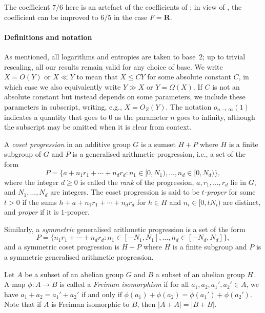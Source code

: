 \documentclass[twoside, 10pt]{article}
\newcommand{\RR}{\mathbf{R}}   %
\begin{document}
The coefficient $7/6$ here is an artefact of the coefficients 
of ; in view of , the 
coefficient can be improved to $6/5$ in the case $F=\RR$.

\paragraph{Definitions and notation}
As mentioned, all logarithms and entropies are taken to base~2; 
up to trivial rescaling, all our results remain valid for any choice 
of base. We write $X = O(Y)$ or $X\ll Y$ to mean that $X \le CY$ for 
some absolute constant $C$, in which case we also 
equivalently write $Y\gg X$ or $Y = \Omega(X)$. 
If $C$ is not an absolute constant but instead depends on some parameters, 
we include these parameters in subscript, writing, e.g., $X = O_Z(Y)$. 
The notation $o_{n\to\infty}(1)$ indicates a quantity that 
goes to $0$ as the parameter $n$ goes to infinity, although
the subscript may be omitted when it is clear from context.

A {\it coset progression} in an additive group $G$ is a sumset $H+P$ where $H$ is
a finite subgroup of $G$ and $P$ is a generalised arithmetic progression, i.e., a set of
the form
$$ P = \bigl\{a + n_1 r_1 + \cdots + n_d r_d : n_1 \in [0, N_1) ,\ldots, n_d\in [0,N_d)\bigr\},$$
where the integer $d\ge 0$ is called the {\it rank} of the progression, $a,r_1,\ldots,r_d$
lie in $G$, and $N_1,\ldots,N_d$ are integers. The coset progression is said to be
{\it $t$-proper} for some $t>0$ if the sums $h+a+n_1r_1 + \cdots + n_dr_d$ for $h\in H$
and $n_i\in [0,tN_i)$ are distinct, and {\it proper} if it is $1$-proper.

Similarly,
a {\it symmetric} generalised arithmetic progression
is a set of the form
$$ P = \bigl\{n_1 r_1 + \cdots + n_d r_d : n_1 \in [-N_1,N_1] 
,\ldots, n_d\in [-N_d, N_d]\bigr\},$$
and a symmetric coset progression is $H+P$ where $H$ is 
a finite subgroup and $P$
is a symmetric generalised arithmetic progression.

Let $A$ be a subset of an abelian group $G$ and $B$ a subset of an abelian group $H$. A map
$\phi : A\to B$ is called a {\it Freiman isomorphism} if for all $a_1, a_2, a_1', a_2'\in A$,
we have $a_1 + a_2 = a_1' + a_2'$ if and only if $\phi(a_1) + \phi(a_2) = \phi(a_1') + \phi(a_2')$.
Note that if $A$ is Freiman isomorphic to $B$, then $|A+A| = |B+B|$.
\end{document}
